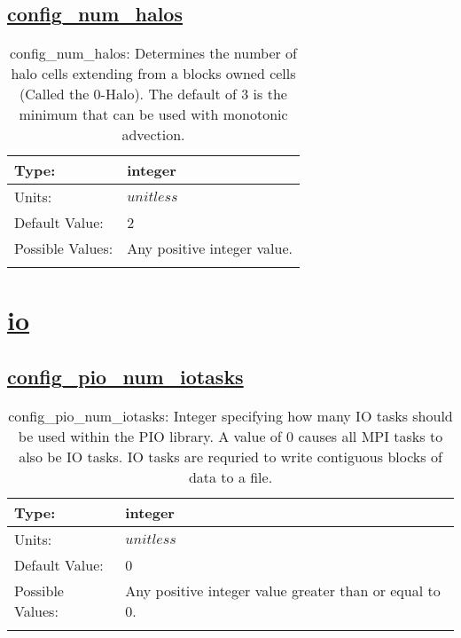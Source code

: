 \subsection[config\_num\_halos]{\hyperref[sec:nm_tab_cice_model]{config\_num\_halos}}
\label{subsec:nm_sec_config_num_halos}
\begin{center}
\begin{longtable}{| p{2.0in} || p{4.0in} |}
    \hline
    Type: & integer \\
    \hline
    Units: & $unitless$ \\
    \hline
    Default Value: & 2 \\
    \hline
    Possible Values: & Any positive integer value. \\
    \hline
    \caption{config\_num\_halos: Determines the number of halo cells extending from a blocks owned cells (Called the 0-Halo). The default of 3 is the minimum that can be used with monotonic advection.}
\end{longtable}
\end{center}
\section[io]{\hyperref[sec:nm_tab_io]{io}}
\label{sec:nm_sec_io}
\subsection[config\_pio\_num\_iotasks]{\hyperref[sec:nm_tab_io]{config\_pio\_num\_iotasks}}
\label{subsec:nm_sec_config_pio_num_iotasks}
\begin{center}
\begin{longtable}{| p{2.0in} || p{4.0in} |}
    \hline
    Type: & integer \\
    \hline
    Units: & $unitless$ \\
    \hline
    Default Value: & 0 \\
    \hline
    Possible Values: & Any positive integer value greater than or equal to 0. \\
    \hline
    \caption{config\_pio\_num\_iotasks: Integer specifying how many IO tasks should be used within the PIO library. A value of 0 causes all MPI tasks to also be IO tasks. IO tasks are requried to write contiguous blocks of data to a file.}
\end{longtable}
\end{center}
